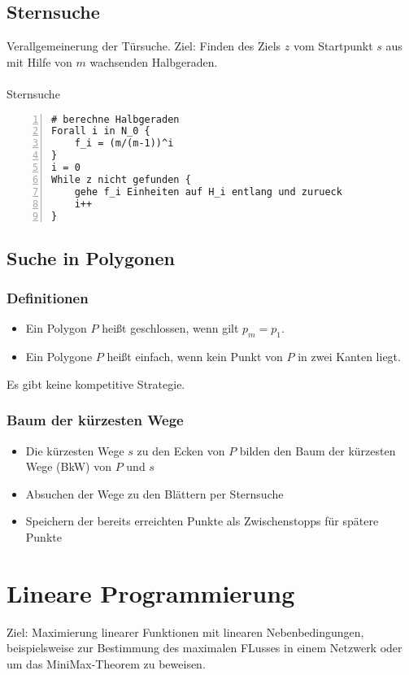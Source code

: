 \subsection{Sternsuche}
Verallgemeinerung der Türsuche. Ziel: Finden des Ziels \(z\) vom Startpunkt \(s\) aus mit Hilfe von \(m\) wachsenden Halbgeraden.
\\\\
Sternsuche
\begin{lstlisting}[frame=single,numbers=left]
# berechne Halbgeraden
Forall i in N_0 {
	f_i = (m/(m-1))^i
}
i = 0
While z nicht gefunden {
	gehe f_i Einheiten auf H_i entlang und zurueck
	i++
}
\end{lstlisting}


\subsection{Suche in Polygonen}

\subsubsection{Definitionen}
\begin{itemize}
	\item Ein Polygon \(P\) heißt geschlossen, wenn gilt \(p_m = p_1\).
	\item Ein Polygone \(P\) heißt einfach, wenn kein Punkt von \(P\) in zwei Kanten liegt.
\end{itemize}
Es gibt keine kompetitive Strategie.

\subsubsection{Baum der kürzesten Wege}
\begin{itemize}
	\item Die kürzesten Wege \(s\) zu den Ecken von \(P\) bilden den Baum der kürzesten Wege (BkW) von \(P\) und \(s\)
	\item Absuchen der Wege zu den Blättern per Sternsuche
	\item Speichern der bereits erreichten Punkte als Zwischenstopps für spätere Punkte
\end{itemize}



\section{Lineare Programmierung}
Ziel: Maximierung linearer Funktionen mit linearen Nebenbedingungen, beispielsweise zur Bestimmung des maximalen FLusses in einem Netzwerk oder um das MiniMax-Theorem zu beweisen.

